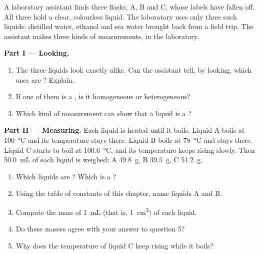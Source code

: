 \begin{problem}
\label{pb:g6:pure-substances-and-mixtures:1}
A laboratory assistant finds three flasks, A, B and C, whose labels have
fallen off. All three hold a clear, colourless liquid. The laboratory
uses only three such liquids: distilled water, ethanol and sea water
brought back from a field trip. The assistant makes three kinds of
measurements, in the laboratory.

\medskip
\noindent\textbf{Part I --- Looking.}
\begin{enumerate}
  \item The three liquids look exactly alike. Can the assistant tell, by
        looking, which ones are ? Explain.
  \item If one of them is a , is it homogeneous or heterogeneous?
  \item Which kind of measurement can show that a liquid is a ?
\end{enumerate}

\medskip
\noindent\textbf{Part II --- Measuring.}
Each liquid is heated until it boils. Liquid A boils at
\qty{100}{\celsius} and its temperature stays there. Liquid B boils at
\qty{78}{\celsius} and stays there. Liquid C starts to boil at
\qty{100.6}{\celsius}, and its temperature keeps rising slowly. Then
\qty{50.0}{mL} of each liquid is weighed: A \qty{49.8}{g}, B
\qty{39.5}{g}, C \qty{51.2}{g}.
\begin{enumerate}[resume]
  \item Which liquids are ? Which is a ?
  \item Using the table of constants of this chapter, name liquids A and
        B.
  \item Compute the mass of \qty{1}{mL} (that is, \qty{1}{cm^3}) of each
        liquid.
  \item Do these masses agree with your answer to question 5?
  \item Why does the temperature of liquid C keep rising while it boils?
\end{enumerate}


\end{problem}
